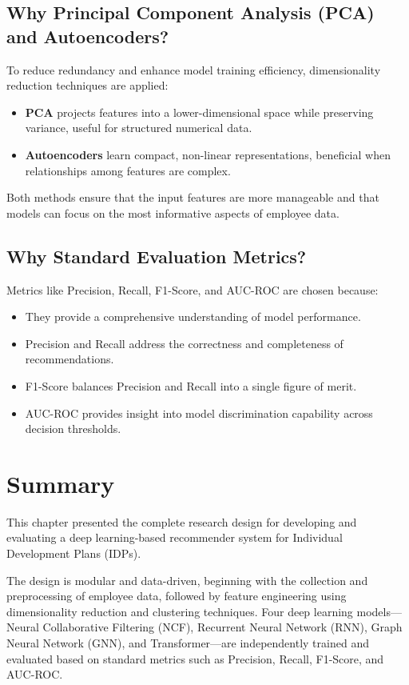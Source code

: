\subsection{Why Principal Component Analysis (PCA) and Autoencoders?}
To reduce redundancy and enhance model training efficiency, dimensionality reduction techniques are applied:
\begin{itemize}
    \item \textbf{PCA} projects features into a lower-dimensional space while preserving variance, useful for structured numerical data.
    \item \textbf{Autoencoders} learn compact, non-linear representations, beneficial when relationships among features are complex.
\end{itemize}
Both methods ensure that the input features are more manageable and that models can focus on the most informative aspects of employee data.

\subsection{Why Standard Evaluation Metrics?}
Metrics like Precision, Recall, F1-Score, and AUC-ROC are chosen because:
\begin{itemize}
    \item They provide a comprehensive understanding of model performance.
    \item Precision and Recall address the correctness and completeness of recommendations.
    \item F1-Score balances Precision and Recall into a single figure of merit.
    \item AUC-ROC provides insight into model discrimination capability across decision thresholds.
\end{itemize}

\section{Summary}
\label{section:research_design_summary}

This chapter presented the complete research design for developing and evaluating a deep learning-based recommender system for Individual Development Plans (IDPs). 

The design is modular and data-driven, beginning with the collection and preprocessing of employee data, followed by feature engineering using dimensionality reduction and clustering techniques. Four deep learning models—Neural Collaborative Filtering (NCF), Recurrent Neural Network (RNN), Graph Neural Network (GNN), and Transformer—are independently trained and evaluated based on standard metrics such as Precision, Recall, F1-Score, and AUC-ROC.

